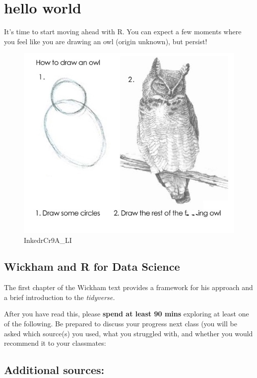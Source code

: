 \documentclass[openany]{book}
\begin{document}
\hypertarget{hello-world}{%
\chapter{hello world}\label{hello-world}}

It's time to start moving ahead with R. You can expect a few moments where you feel like you are drawing an owl (origin unknown), but persist!

\begin{figure}
\centering
\includegraphics{InkedrCr9A_LI.jpg}
\caption{InkedrCr9A\_LI}
\end{figure}

\hypertarget{wickham-and-r-for-data-science}{%
\section{Wickham and R for Data Science}\label{wickham-and-r-for-data-science}}

The first chapter of the Wickham text provides a framework for his approach and a brief introduction to the \emph{tidyverse.}

After you have read this, please \textbf{spend at least 90 mins} exploring at least one of the following. Be prepared to discuss your progress next class (you will be asked which source(s) you used, what you struggled with, and whether you would recommend it to your classmates:

\hypertarget{additional-sources}{%
\section{Additional sources:}\label{additional-sources}}
\end{document}
